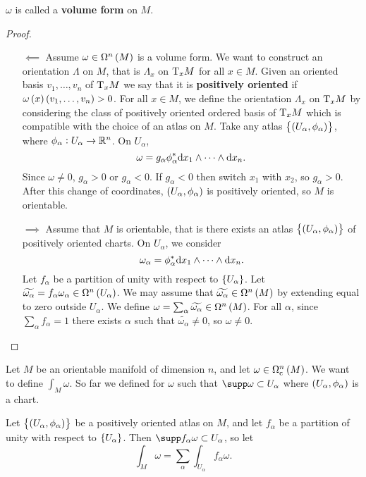 $ \omega $ is called a \textbf{volume form} on $ M $.

\begin{proof}
\hfill
\begin{itemize}
\item[$ \impliedby $] Assume $ \omega \in \Omega^n\br{M} $ is a volume form. We want to construct an orientation $ \Lambda $ on $ M $, that is $ \Lambda_x $ on $ \mathrm{T}_xM $ for all $ x \in M $. Given an oriented basis $ v_1, \dots, v_n $ of $ \mathrm{T}_xM $ we say that it is \textbf{positively oriented} if $ \omega\br{x}\br{v_1, \dots, v_n} > 0 $. For all $ x \in M $, we define the orientation $ \Lambda_x $ on $ \mathrm{T}_xM $ by considering the class of positively oriented ordered basis of $ \mathrm{T}_xM $ which is compatible with the choice of an atlas on $ M $. Take any atlas $ \cbr{\br{U_\alpha, \phi_\alpha}} $, where $ \phi_\alpha : U_\alpha \to \mathbb{R}^n $. On $ U_\alpha $,
$$ \omega = g_\alpha\phi_\alpha^*\mathrm{d} x_1 \wedge \dots \wedge \mathrm{d} x_n. $$
Since $ \omega \ne 0 $, $ g_\alpha > 0 $ or $ g_\alpha < 0 $. If $ g_\alpha < 0 $ then switch $ x_1 $ with $ x_2 $, so $ g_\alpha > 0 $. After this change of coordinates, $ \br{U_\alpha, \phi_\alpha} $ is positively oriented, so $ M $ is orientable.


\item[$ \implies $] Assume that $ M $ is orientable, that is there exists an atlas $ \cbr{\br{U_\alpha, \phi_\alpha}} $ of positively oriented charts. On $ U_\alpha $, we consider
$$ \omega_\alpha = \phi_\alpha^*\mathrm{d} x_1 \wedge \dots \wedge \mathrm{d} x_n. $$
Let $ f_\alpha $ be a partition of unity with respect to $ \cbr{U_\alpha} $. Let $ \widetilde{\omega_\alpha} = f_\alpha\omega_\alpha \in \Omega^n\br{U_\alpha} $. We may assume that $ \widetilde{\omega_\alpha} \in \Omega^n\br{M} $ by extending equal to zero outside $ U_\alpha $. We define $ \omega = \sum_\alpha \widetilde{\omega_\alpha} \in \Omega^n\br{M} $. For all $ \alpha $, since $ \sum_\alpha f_\alpha = 1 $ there exists $ \alpha $ such that $ \widetilde{\omega_\alpha} \ne 0 $, so $ \omega \ne 0 $.
\end{itemize}
\end{proof}

Let $ M $ be an orientable manifold of dimension $ n $, and let $ \omega \in \Omega_\c^n\br{M} $. We want to define $ \int_M \omega $. So far we defined for $ \omega $ such that $ \supp \omega \subset U_\alpha $ where $ \br{U_\alpha, \phi_\alpha} $ is a chart.

\begin{definition}
Let $ \cbr{\br{U_\alpha, \phi_\alpha}} $ be a positively oriented atlas on $ M $, and let $ f_\alpha $ be a partition of unity with respect to $ \cbr{U_\alpha} $. Then $ \supp f_\alpha\omega \subset U_\alpha $, so let
$$ \int_M \omega = \sum_\alpha \int_{U_\alpha} f_\alpha\omega. $$
\end{definition}

